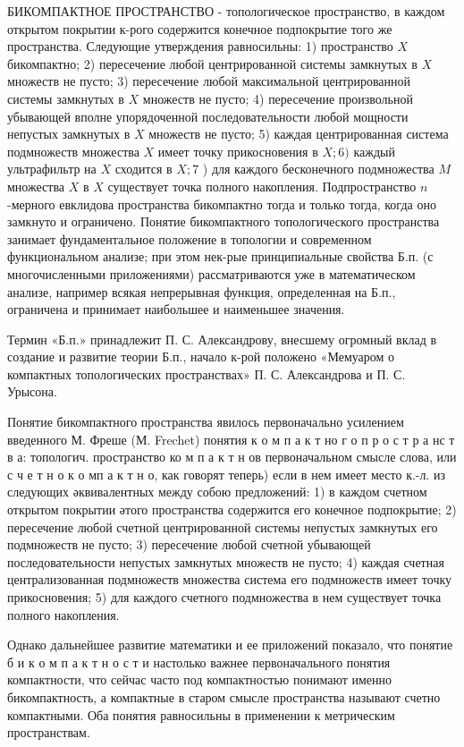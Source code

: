 \documentclass[10pt]{article}
\begin{document}
БИКОМПАКТНОЕ ПРОСТРАНСТВО - топологическое пространство, в каждом открытом покрытии к-рого содержится конечное подпокрытие того же пространства. Следующие утверждения равносильны: 1) пространство $X$ бикомпактно; 2) пересечение любой центрированной системы замкнутых в $X$ множеств не пусто; 3) пересечение любой максимальной центрированной системы замкнутых в $X$ множеств не пусто; 4) пересечение произвольной убывающей вполне упорядоченной последовательности любой мощности непустых замкнутых в $X$ множеств не пусто; 5) каждая центрированная система подмножеств множества $X$ имеет точку прикосновения в $X ; 6)$ каждый ультрафильтр на $X$ сходится в $X ; 7$ ) для каждого бесконечного подмножества $M$ множества $X$ в $X$ существует точка полного накопления. Подпространство $n$-мерного евклидова пространства бикомпактно тогда и только тогда, когда оно замкнуто и ограничено. Понятие бикомпактного топологического пространства занимает фундаментальное положение в топологии и современном функциональном анализе; при этом нек-рые принципиальные свойства Б.п. (с многочисленными приложениями) рассматриваются уже в математическом анализе, например всякая непрерывная функция, определенная на Б.п., ограничена и принимает наибольшее и наименьшее значения.



Термин «Б.п.» принадлежит П. С. Александрову, внесшему огромный вклад в создание и развитие теории Б.п., начало к-рой положено «Мемуаром о компактных топологических пространствах» П. С. Александрова и П. С. Урысона.



Понятие бикомпактного пространства явилось первоначально усилением введенного М. Фреше (М. Frechet) понятия к о м п а к т но г о п р о с т р а нс т в а: топологич. пространство ко м п а к т н ов первоначальном смысле слова, или с ч е т н о к о мп а к т н о, как говорят теперь) если в нем имеет место к.-л. из следующих әквивалентных между собою предложений: 1) в каждом счетном открытом покрытии әтого пространства содержится его конечное подпокрытие; 2) пересечение любой счетной центрированной системы непустых замкнутых его подмножеств не пусто; 3) пересечение любой счетной убывающей последовательности непустых замкнутых множеств не пусто; 4) каждая счетная централизованная подмножеств множества система его подмножеств имеет точку прикосновения; 5) для каждого счетного подмножества в нем существует точка полного накопления.



Однако дальнейшее развитие математики и ее приложений показало, что понятие б и к о м п а к т н о с т и настолько важнее первоначального понятия компактности, что сейчас часто под компактностью понимают именно бикомпактность, а компактные в старом смысле пространства называют счетно компактными. Оба понятия равносильны в применении к метрическим пространствам.
\end{document}
